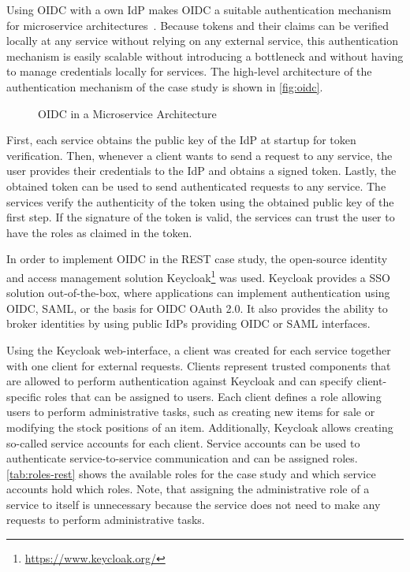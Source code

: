 Using \ac{OIDC} with a own \ac{IdP} makes \ac{OIDC} a suitable authentication mechanism for microservice architectures~\cite{Nehme2019}.
Because tokens and their claims can be verified locally at any service without relying on any external service, this authentication mechanism is easily scalable without introducing a bottleneck and without having to manage credentials locally for services.
The high-level architecture of the authentication mechanism of the case study is shown in \autoref{fig:oidc}.

\begin{figure}[!htb]
    \centering
    
    \caption{\acs{OIDC} in a Microservice Architecture}\label{fig:oidc}
\end{figure}

First, each service obtains the public key of the \ac{IdP} at startup for token verification.
Then, whenever a client wants to send a request to any service, the user provides their credentials to the \ac{IdP} and obtains a signed token.
Lastly, the obtained token can be used to send authenticated requests to any service.
The services verify the authenticity of the token using the obtained public key of the first step.
If the signature of the token is valid, the services can trust the user to have the roles as claimed in the token.

In order to implement \ac{OIDC} in the \ac{REST} case study, the open-source identity and access management solution Keycloak\footnote{\url{https://www.keycloak.org/}} was used.
Keycloak provides a \ac{SSO} solution out-of-the-box, where applications can implement authentication using \ac{OIDC}, \ac{SAML}, or the basis for \ac{OIDC} OAuth 2.0.
It also provides the ability to broker identities by using public \acp{IdP} providing \ac{OIDC} or \ac{SAML} interfaces.

Using the Keycloak web-interface, a client was created for each service together with one client for external requests.
Clients represent trusted components that are allowed to perform authentication against Keycloak and can specify client-specific roles that can be assigned to users.
Each client defines a role allowing users to perform administrative tasks, such as creating new items for sale or modifying the stock positions of an item.
Additionally, Keycloak allows creating so-called service accounts for each client.
Service accounts can be used to authenticate service-to-service communication and can be assigned roles.
\autoref{tab:roles-rest} shows the available roles for the case study and which service accounts hold which roles.
Note, that assigning the administrative role of a service to itself is unnecessary because the service does not need to make any requests to perform administrative tasks.

